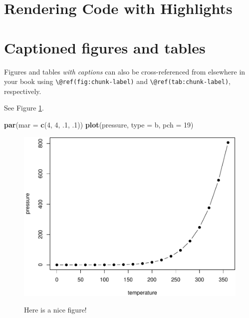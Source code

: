 \documentclass[
]{book}
\newenvironment{Shaded}{\begin{snugshade}}{\end{snugshade}}
\newcommand{\AttributeTok}[1]{\textcolor[rgb]{0.13,0.29,0.53}{#1}}
\newcommand{\DecValTok}[1]{\textcolor[rgb]{0.00,0.00,0.81}{#1}}
\newcommand{\FunctionTok}[1]{\textcolor[rgb]{0.13,0.29,0.53}{\textbf{#1}}}
\newcommand{\NormalTok}[1]{#1}
\newcommand{\StringTok}[1]{\textcolor[rgb]{0.31,0.60,0.02}{#1}}
\theoremstyle{definition}
\theoremstyle{definition}
\theoremstyle{definition}
\theoremstyle{definition}
\theoremstyle{remark}
\begin{document}
\section{Rendering Code with Highlights}\label{rendering-code-with-highlights}

\section{Captioned figures and tables}\label{captioned-figures-and-tables}

Figures and tables \emph{with captions} can also be cross-referenced from elsewhere in your book using \texttt{\textbackslash{}@ref(fig:chunk-label)} and \texttt{\textbackslash{}@ref(tab:chunk-label)}, respectively.

See Figure \ref{fig:nice-fig}.

\begin{Shaded}
\begin{Highlighting}[]
\FunctionTok{par}\NormalTok{(}\AttributeTok{mar =} \FunctionTok{c}\NormalTok{(}\DecValTok{4}\NormalTok{, }\DecValTok{4}\NormalTok{, .}\DecValTok{1}\NormalTok{, .}\DecValTok{1}\NormalTok{))}
\FunctionTok{plot}\NormalTok{(pressure, }\AttributeTok{type =} \StringTok{\textquotesingle{}b\textquotesingle{}}\NormalTok{, }\AttributeTok{pch =} \DecValTok{19}\NormalTok{)}
\end{Highlighting}
\end{Shaded}

\begin{figure}

{\centering \includegraphics[width=0.8\linewidth,alt={Plot with connected points showing that vapor pressure of mercury increases exponentially as temperature increases.}]{_main_files/figure-latex/nice-fig-1} 

}

\caption{Here is a nice figure!}\label{fig:nice-fig}
\end{figure}
\end{document}
